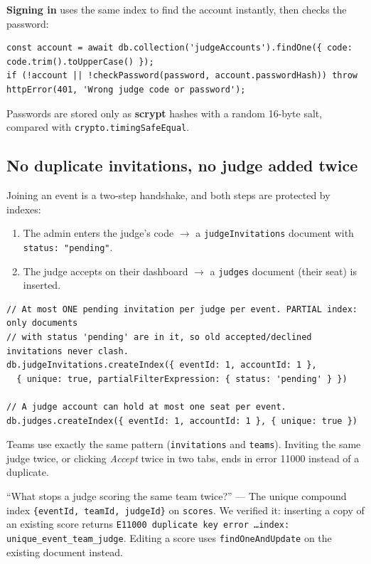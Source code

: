 \documentclass[11pt,a4paper]{article}
\newcommand{\coll}[1]{\texttt{#1}}
\begin{document}
\textbf{Signing in} uses the same index to find the account instantly, then checks the password:
\begin{lstlisting}
const account = await db.collection('judgeAccounts').findOne({ code: code.trim().toUpperCase() });
if (!account || !checkPassword(password, account.passwordHash)) throw httpError(401, 'Wrong judge code or password');
\end{lstlisting}
Passwords are stored only as \textbf{scrypt} hashes with a random 16-byte salt, compared with
\texttt{crypto.timingSafeEqual}.

\subsection{No duplicate invitations, no judge added twice}
Joining an event is a two-step handshake, and both steps are protected by indexes:

\begin{enumerate}[leftmargin=1.6em]
  \item The admin enters the judge's code $\rightarrow$ a \coll{judgeInvitations} document with
        \texttt{status: "pending"}.
  \item The judge accepts on their dashboard $\rightarrow$ a \coll{judges} document (their seat) is inserted.
\end{enumerate}

\begin{lstlisting}
// At most ONE pending invitation per judge per event. PARTIAL index: only documents
// with status 'pending' are in it, so old accepted/declined invitations never clash.
db.judgeInvitations.createIndex({ eventId: 1, accountId: 1 },
  { unique: true, partialFilterExpression: { status: 'pending' } })

// A judge account can hold at most one seat per event.
db.judges.createIndex({ eventId: 1, accountId: 1 }, { unique: true })
\end{lstlisting}
Teams use exactly the same pattern (\coll{invitations} and \coll{teams}). Inviting the same judge twice, or clicking
\emph{Accept} twice in two tabs, ends in error 11000 instead of a duplicate.

\begin{viva}
``What stops a judge scoring the same team twice?'' --- The unique compound index
\texttt{\{eventId, teamId, judgeId\}} on \coll{scores}. We verified it: inserting a copy of an existing score returns
\texttt{E11000 duplicate key error \dots index: unique\_event\_team\_judge}. Editing a score uses
\texttt{findOneAndUpdate} on the existing document instead.
\end{viva}
\end{document}
